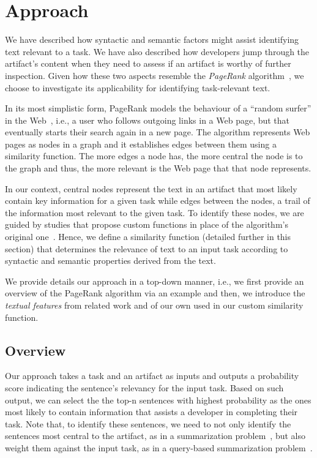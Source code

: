 \section{Approach}
\label{cp5:approaches}


We have described how syntactic and semantic factors might assist 
identifying  text relevant to a task. %
We have also described how developers jump through the artifact's content when they  
need to assess if an artifact is worthy of further inspection. 
Given how these two aspects resemble the \textit{PageRank} algorithm~\cite{Page1999}, 
we choose to investigate its applicability for identifying task-relevant text.


In its most simplistic form, PageRank models the behaviour 
of a ``random surfer'' in the Web~\cite{Page1999}, i.e., 
a user who follows outgoing links in a Web page, but that 
eventually starts their search again in a new page. 
The algorithm represents Web pages as nodes in a graph and it
establishes edges between them using a similarity function.
The more edges a node has, the more central the node is to the graph
and thus, the more relevant is the Web page that that node represents.


In our context, central nodes represent the text in an artifact that most likely 
contain key information for a given task while edges between the nodes, a trail of the information most relevant to the given task.
To identify these nodes, we are guided by studies that 
propose custom functions in place of the algorithm's original one~\cite{Lotufo2012, Ponzanelli2017}. Hence, we define a similarity function (detailed further in this section)
that determines the relevance of text to an input task
according to syntactic and semantic properties derived from the text.


We provide details  our approach in a top-down manner, i.e., we first
provide an overview of the PageRank algorithm via an example and
then, we introduce the \textit{textual features} from related work and of our own used in our custom similarity function.


\subsection{Overview}


Our approach takes a task and an artifact as inputs and outputs 
a probability score indicating the sentence's relevancy for the input task. 
Based on such output, we can select the the top-n sentences with highest probability as the ones most likely to contain information that assists a developer in completing their task. 
Note that, to identify these sentences, we need to not only identify the sentences most central to the artifact, as in a summarization problem~\cite{Rastkar2010,Lotufo2012},
but also weight them against the input task, as in a query-based summarization problem~\cite{Xu2017, Goldsteinet1999}.



